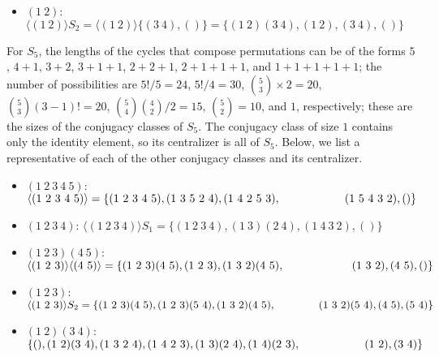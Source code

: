 \documentclass[a4paper,12pt]{article}
\begin{document}
\begin{enumerate}
\begin{itemize}
            \item
                $(1\ 2)$: $\langle (1\ 2) \rangle S_2 = \langle (1\ 2) \rangle \{ (3\ 4), () \} = \{ (1\ 2)(3\ 4), (1\ 2), (3\ 4), () \}$
        \end{itemize}
        For $S_5$, the lengths of the cycles that compose permutations can be of the forms $5$, $4 + 1$, $3 + 2$, $3 + 1 + 1$, $2 + 2 + 1$, $2 + 1 + 1 + 1$, and $1 + 1 + 1 + 1 + 1$; the number of possibilities are $5!/5 = 24$, $5!/4 = 30$, $\binom{5}{3} \times 2 = 20$, $\binom{5}{3} (3 - 1)! = 20$, $\binom{5}{4} \binom{4}{2} / 2 = 15$, $\binom{5}{2} = 10$, and $1$, respectively; these are the sizes of the conjugacy classes of $S_5$. The conjugacy class of size $1$ contains only the identity element, so its centralizer is all of $S_5$. Below, we list a representative of each of the other conjugacy classes and its centralizer.
        \begin{itemize}
            \item
                $(1\ 2\ 3\ 4\ 5)$: $\langle (1\ 2\ 3\ 4\ 5) \rangle = \{ (1\ 2\ 3\ 4\ 5), (1\ 3\ 5\ 2\ 4), (1\ 4\ 2\ 5\ 3), \\
                ~~~~~~~~~~~~~~~~~(1\ 5\ 4\ 3\ 2), () \}$
                
            \item
                $(1\ 2\ 3\ 4)$: $\langle (1\ 2\ 3\ 4) \rangle S_1 = \{ (1\ 2\ 3\ 4), (1\ 3)(2\ 4), (1\ 4\ 3\ 2), () \}$
                
            \item
                $(1\ 2\ 3)(4\ 5)$: $\langle (1\ 2\ 3) \rangle \langle (4\ 5) \rangle = \{ (1\ 2\ 3)(4\ 5), (1\ 2\ 3), (1\ 3\ 2)(4\ 5), \\
                ~~~~~~~~~~~~~~~~~~(1\ 3\ 2), (4\ 5), () \}$
                
            \item
                $(1\ 2\ 3)$: $\langle (1\ 2\ 3) \rangle S_2 = \{ (1\ 2\ 3)(4\ 5), (1\ 2\ 3)(5\ 4), (1\ 3\ 2)(4\ 5), \\
                ~~~~~~~~~~~~(1\ 3\ 2)(5\ 4), (4\ 5), (5\ 4) \}$
                
            \item
                $(1\ 2)(3\ 4)$: $\{ (), (1\ 2)(3\ 4), (1\ 3\ 2\ 4), (1\ 4\ 2\ 3), (1\ 3)(2\ 4), (1\ 4)(2\ 3), \\
                ~~~~~~~~~~~~~~~~~(1\ 2), (3\ 4) \}$
                

\end{itemize}
\end{enumerate}
\end{document}
